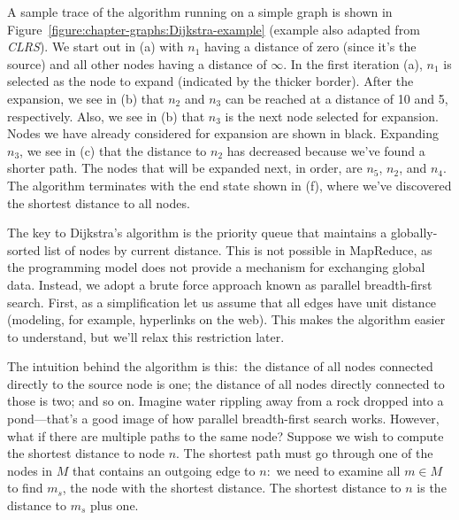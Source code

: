 A sample trace of the algorithm running on a simple graph is shown in
Figure~\ref{figure:chapter-graphs:Dijkstra-example} (example also adapted
from \emph{CLRS}).  We start out in (a) with $n_1$ having a
distance of zero (since it's the source) and all other nodes having a
distance of $\infty$.  In the first iteration (a), $n_1$ is selected
as the node to expand (indicated by the thicker border).  After the
expansion, we see in (b) that $n_2$ and $n_3$ can be reached at a
distance of 10 and 5, respectively.  Also, we see in (b) that $n_3$ is
the next node selected for expansion.  Nodes we have already
considered for expansion are shown in black.  Expanding $n_3$, we see
in (c) that the distance to $n_2$ has decreased because we've found a
shorter path.  The nodes that will be expanded next, in order, are
$n_5$, $n_2$, and $n_4$.  The algorithm terminates with the end state
shown in (f), where we've discovered the shortest distance to all
nodes.

The key to Dijkstra's algorithm is the priority queue that maintains a
globally-sorted list of nodes by current distance.  This is not
possible in MapReduce, as the programming model does not provide a
mechanism for exchanging global data.  Instead, we adopt a brute force
approach known as parallel breadth-first search.  First, as a
simplification let us assume that all edges have unit distance
(modeling, for example, hyperlinks on the web).  This makes the
algorithm easier to understand, but we'll relax this restriction
later.

The intuition behind the algorithm is this:\ the distance of all nodes
connected directly to the source node is one; the distance of all
nodes directly connected to those is two; and so on.  Imagine water
rippling away from a rock dropped into a pond---that's a good image of
how parallel breadth-first search works.  However, what if there are
multiple paths to the same node?  Suppose we wish to compute the
shortest distance to node $n$.  The shortest path must go through one
of the nodes in $M$ that contains an outgoing edge to $n$:\ we need to
examine all $m \in M$ to find $m_s$, the node with the shortest distance.
The shortest distance to $n$ is the distance to $m_s$ plus one.


